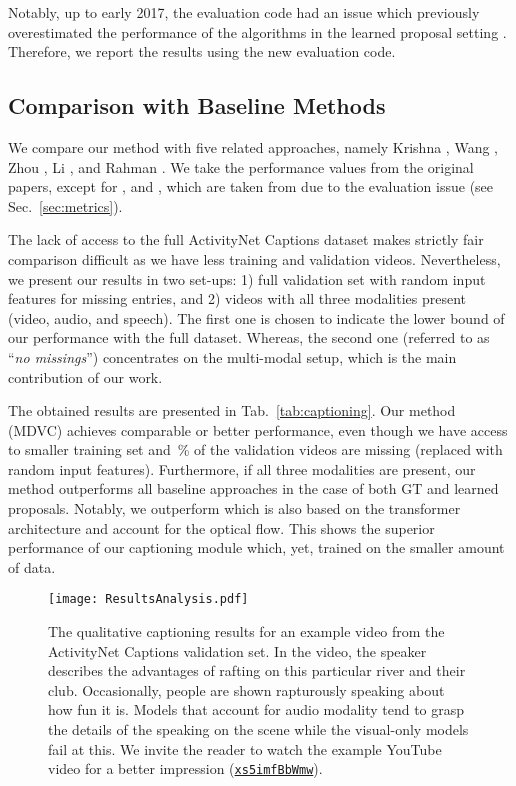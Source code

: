 \documentclass[10pt,twocolumn,letterpaper]{article}
\begin{document}
Notably, up to early 2017, the evaluation code had an issue which previously overestimated the performance of the algorithms in the learned proposal setting \cite{Mun2019}. Therefore, we report the results using the new evaluation code. 

\subsection{Comparison with Baseline Methods}
We compare our method with five related approaches, namely Krishna \etal \cite{Krishna2017}, Wang \etal \cite{Wang2018n}, Zhou \etal \cite{Zhou2018}, Li \etal \cite{Li2018}, and Rahman \etal \cite{Rahman2019}. We take the performance values from the original papers, except for \cite{Li2018}, and \cite{Zhou2018}, which are taken from \cite{Mun2019} due to the evaluation issue (see Sec.~\ref{sec:metrics}). 

The lack of access to the full ActivityNet Captions dataset makes strictly fair comparison difficult as we have less training and validation videos. Nevertheless, we present our results in two set-ups: 1) full validation set with random input features for missing entries, and 2) videos with all three modalities present (video, audio, and speech). The first one is chosen to indicate the lower bound of our performance with the full dataset. Whereas, the second one (referred to as ``\textit{no missings}'') concentrates on the multi-modal setup, which is the main contribution of our work. 

The obtained results are presented in Tab.~\ref{tab:captioning}. Our method (MDVC) achieves comparable or better performance, even though we have access to smaller training set and \,\% of the validation videos are missing (replaced with random input features). Furthermore, if all three modalities are present, our method outperforms all baseline approaches in the case of both GT and learned proposals. Notably, we outperform \cite{Zhou2018} which is also based on the transformer architecture and account for the optical flow. This shows the superior performance of our captioning module which, yet, trained on the smaller amount of data. 

\begin{figure*}[t]
    \begin{center}
\texttt{[image: ResultsAnalysis.pdf]}
    \end{center}
    \vspace{-1em}
    \caption{The qualitative captioning results for an example video from the ActivityNet Captions validation set. In the video, the speaker describes the advantages of rafting on this particular river and their club. Occasionally, people are shown rapturously speaking about how fun it is. Models that account for audio modality tend to grasp the details of the speaking on the scene while the visual-only models fail at this. We invite the reader to watch the example YouTube video for a better impression (\texttt{\href{https://www.youtube.com/embed/xs5imfBbWmw?rel=0}{xs5imfBbWmw}}).\label{fig:results_analysis} 
    }
\end{figure*}
\end{document}
